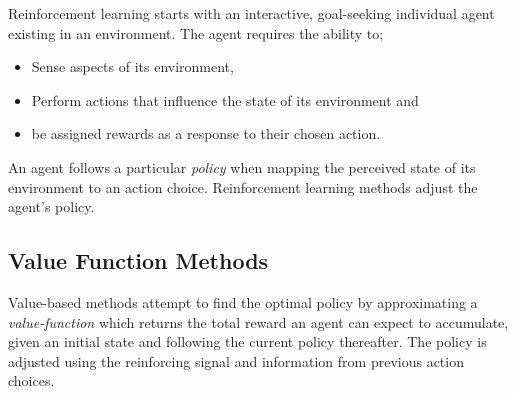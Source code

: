 Reinforcement learning starts with an interactive, goal-seeking individual
agent existing in an environment.  The agent requires the ability to;
\begin{itemize}
  \item Sense aspects of its environment,
  \item Perform actions that influence the state of its environment and
  \item be assigned rewards as a response to their chosen action.
\end{itemize}
An agent follows a particular \textit{policy} when mapping the perceived state
of its environment to an action choice.  Reinforcement learning methods adjust
the agent's policy.


\subsection{Value Function Methods}
\label{sec:valuebased}
Value-based methods attempt to find the optimal policy by
approximating a \textit{value-function} which returns the total reward an
agent can expect to accumulate, given an initial state and following the
current policy thereafter.  The policy is adjusted using the reinforcing
signal and information from previous action choices.

